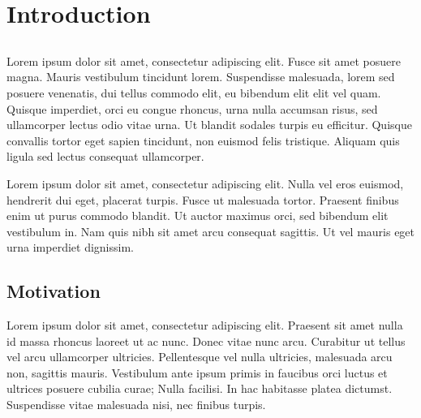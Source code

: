 
\chapter{Introduction}\label{cap:intro}

\section{}\label{sect:description}
\hspace{\parindent} Lorem ipsum dolor sit amet, consectetur adipiscing elit. Fusce sit amet posuere magna. Mauris vestibulum tincidunt lorem. Suspendisse malesuada, lorem sed posuere venenatis, dui tellus commodo elit, eu bibendum elit elit vel quam. Quisque imperdiet, orci eu congue rhoncus, urna nulla accumsan risus, sed ullamcorper lectus odio vitae urna. Ut blandit sodales turpis eu efficitur. Quisque convallis tortor eget sapien tincidunt, non euismod felis tristique. Aliquam quis ligula sed lectus consequat ullamcorper.

\vspace*{2mm}
\hspace{\parindent} Lorem ipsum dolor sit amet, consectetur adipiscing elit. Nulla vel eros euismod, hendrerit dui eget, placerat turpis. Fusce ut malesuada tortor. Praesent finibus enim ut purus commodo blandit. Ut auctor maximus orci, sed bibendum elit vestibulum in. Nam quis nibh sit amet arcu consequat sagittis. Ut vel mauris eget urna imperdiet dignissim.

\section{Motivation}\label{sect:motivation}
\hspace{\parindent} Lorem ipsum dolor sit amet, consectetur adipiscing elit. Praesent sit amet nulla id massa rhoncus laoreet ut ac nunc. Donec vitae nunc arcu. Curabitur ut tellus vel arcu ullamcorper ultricies. Pellentesque vel nulla ultricies, malesuada arcu non, sagittis mauris. Vestibulum ante ipsum primis in faucibus orci luctus et ultrices posuere cubilia curae; Nulla facilisi. In hac habitasse platea dictumst. Suspendisse vitae malesuada nisi, nec finibus turpis.


